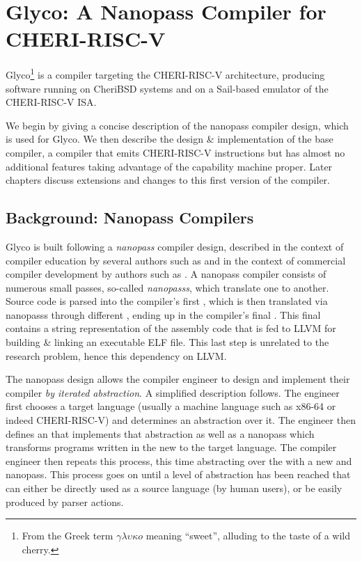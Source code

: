 \documentclass[main.tex]{subfiles}
\begin{document}
\onlyinsubfile{\mainmatter{}}

\chapter{Glyco: A Nanopass Compiler for CHERI-RISC-V}

Glyco\footnote{From the Greek term $\gamma\lambda\upsilon\kappa{}o$ meaning \enquote{sweet}, alluding to the taste of a wild cherry.} is a compiler targeting the CHERI-RISC-V architecture, producing software running on CheriBSD systems and on a Sail-based emulator of the CHERI-RISC-V ISA.

We begin by giving a concise description of the nanopass compiler design, which is used for Glyco. We then describe the design \& implementation of the base compiler, a compiler that emits CHERI-RISC-V instructions but has almost no additional features taking advantage of the capability machine proper. Later chapters discuss extensions and changes to this first version of the compiler.

\section{Background: Nanopass Compilers}
Glyco is built following a \emph{nanopass} compiler design, described in the context of compiler education by several authors such as \cite{educomp} and in the context of commercial compiler development by authors such as \cite{commcomp}. A nanopass compiler consists of numerous small passes, so-called \emph{\glspl{nanopass}}, which translate one \emph{\il{}} to another. Source code is parsed into the compiler’s first \il{}, which is then translated via \glspl{nanopass} through different \ils{}, ending up in the compiler's final \il{}. This final \il{} contains a string representation of the assembly code that is fed to LLVM for building \& linking an executable ELF file. This last step is unrelated to the research problem, hence this dependency on LLVM.

The nanopass design allows the compiler engineer to design and implement their compiler \emph{by iterated abstraction}. A simplified description follows. The engineer first chooses a target language (usually a machine language such as x86-64 or indeed CHERI-RISC-V) and determines an abstraction over it. The engineer then defines an \il{} that implements that abstraction as well as a \gls{nanopass} which transforms programs written in the new \il{} to the target language. The compiler engineer then repeats this process, this time abstracting over the \il{} with a new \il{} and \gls{nanopass}. This process goes on until a level of abstraction has been reached that can either be directly used as a source language (by human users), or be easily produced by parser actions.
\end{document}
